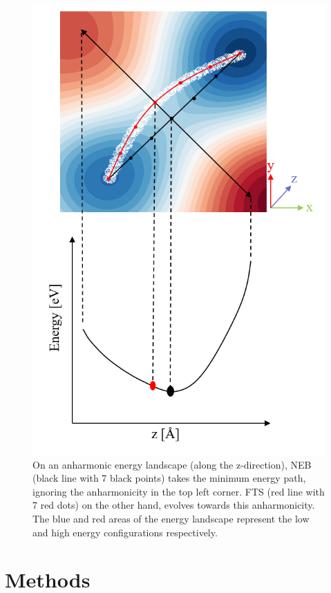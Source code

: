 \documentclass{article}
\begin{document}
\begin{figure}[htp]
\centering
\includegraphics{FTS_anharmonic}
\caption{On an anharmonic energy landscape (along the z-direction), NEB (black line with 7 black points) takes the minimum energy path, ignoring the anharmonicity in the top left corner. FTS (red line with 7 red dots) on the other hand, evolves towards this anharmonicity. The blue and red areas of the energy landscape represent the low and high energy configurations respectively.}
\label{fig:5}
\end{figure}

\newpage

\section{Methods}
\end{document}
